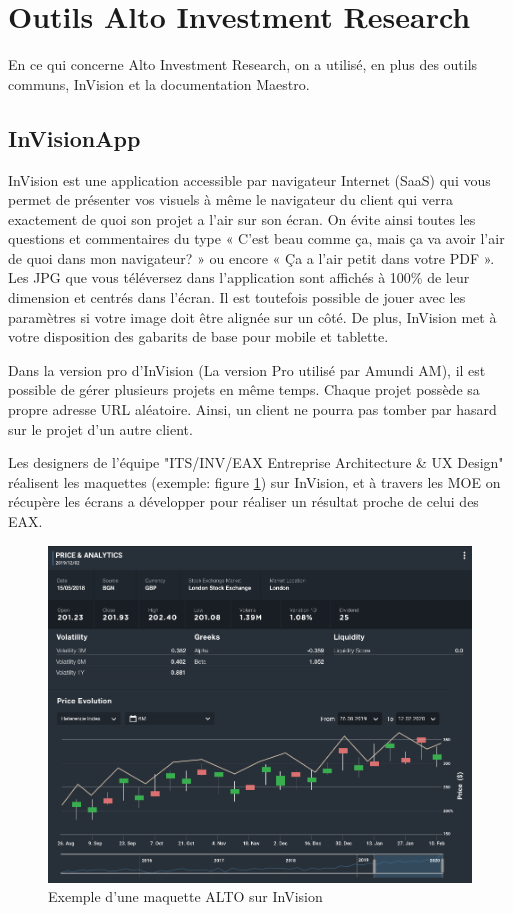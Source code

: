 \section{Outils Alto Investment Research}
\par En ce qui concerne Alto Investment Research, on a utilisé, en plus des outils communs, InVision et la documentation Maestro.
\subsection{InVisionApp}
\par InVision est une application accessible par navigateur Internet (SaaS) qui vous permet de présenter vos visuels à même le navigateur du client qui verra exactement de quoi son projet a l’air sur son écran. On évite ainsi toutes les questions et commentaires du type « C’est beau comme ça, mais ça va avoir l’air de quoi dans mon navigateur? » ou encore « Ça a l’air petit dans votre PDF ». Les JPG que vous téléversez dans l’application sont affichés à 100\% de leur dimension et centrés dans l’écran. Il est toutefois possible de jouer avec les paramètres si votre image doit être alignée sur un côté. De plus, InVision met à votre disposition des gabarits de base pour mobile et tablette.
\par Dans la version pro d’InVision (La version Pro utilisé par Amundi AM), il est possible de gérer plusieurs projets en même temps. Chaque projet possède sa propre adresse URL aléatoire. Ainsi, un client ne pourra pas tomber par hasard sur le projet d’un autre client.
\par Les designers de l'équipe "ITS/INV/EAX Entreprise Architecture \& UX Design" réalisent les maquettes (exemple: figure \ref{fig:invision}) sur InVision, et à travers les MOE on récupère les écrans a développer pour réaliser un résultat proche de celui des EAX.
\clearpage
\begin{figure}[ht]
    \centering
    \includegraphics[width=\columnwidth]{img/AssetInvision.png}
    \caption{Exemple d'une maquette ALTO sur InVision}
    \label{fig:invision}
\end{figure} 

